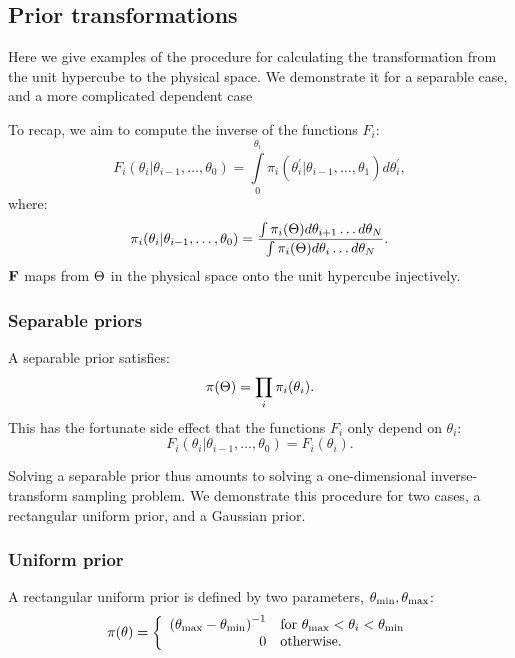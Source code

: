 \subsection{Prior transformations}
\label{sec:pc:prior_transformations}
Here we give examples of the procedure for calculating the transformation from the unit hypercube to the physical space. We demonstrate it for a separable case, and a more complicated dependent case

To recap, we aim to compute the inverse of the functions $F_i$: 
\begin{equation}
  F_i(\theta_i|\theta_{i-1},\ldots,\theta_0) = \int\limits_0^{\theta_i} \pi_i(\theta_i^\prime|\theta_{i-1},\ldots,\theta_1) d\theta_i^\prime,
  \label{eqn:pc:appFi}
\end{equation}
%
where:
%
\begin{equation}
  \pi_i(\theta_i|\theta_{i-1},\ldots,\theta_0) 
  =
  \frac{%
    \int \pi_i(\params) d\theta_{i+1}\ldots d\theta_{N}
  }{%
    \int \pi_i(\params) d\theta_{i}\ldots d\theta_{N}
  }.
  \label{eqn:pc:apppii}
\end{equation}
$\mathbf{F}$ maps from $\Theta$ in the physical space onto the unit hypercube injectively. 



\subsubsection{Separable priors}
\label{sec:pc:separable_priors}
A separable prior satisfies:
\begin{equation}
  \pi(\Theta) = \prod_i\pi_i(\theta_i).
  \label{eqn:pc:separability}
\end{equation}
This has the fortunate side effect that the functions $F_i$ only depend on $\theta_i$:
\begin{equation}
  F_i(\theta_i|\theta_{i-1},\ldots,\theta_0) = F_i(\theta_i).
\end{equation}

Solving a separable prior thus amounts to solving a one-dimensional inverse-transform sampling problem. We demonstrate this procedure for two cases, a rectangular uniform prior, and a Gaussian prior.

\subsubsection{Uniform prior}
\label{sec:pc:uniform_prior}
\newcommand{\thetamin}{\theta_\smin} %
\newcommand{\thetamax}{\theta_\smax} %
A rectangular uniform prior is defined by two parameters, ${\thetamin,\thetamax}$:
\begin{equation}
  \pi(\theta) = 
  \left\{
    \begin{array}{rl}
      {(\thetamax - \thetamin)}^{-1} 
      &
      \text{for }\thetamax<\theta_i<\thetamin \\
      0 & \text{otherwise.}
    \end{array}
  \right.
\label{eqn:pc:uniform_prior}
\end{equation}

